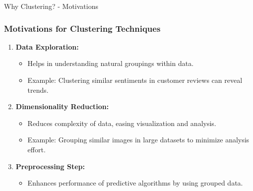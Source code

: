 \documentclass[aspectratio=169]{beamer}
\begin{document}
\begin{frame}[fragile]{Why Clustering? - Motivations}
  \frametitle{Motivations for Clustering Techniques}

  \begin{enumerate}
    \item \textbf{Data Exploration:}
      \begin{itemize}
        \item Helps in understanding natural groupings within data.
        \item Example: Clustering similar sentiments in customer reviews can reveal trends.
      \end{itemize}

    \item \textbf{Dimensionality Reduction:}
      \begin{itemize}
        \item Reduces complexity of data, easing visualization and analysis.
        \item Example: Grouping similar images in large datasets to minimize analysis effort.
      \end{itemize}

    \item \textbf{Preprocessing Step:}
      \begin{itemize}
        \item Enhances performance of predictive algorithms by using grouped data.
      \end{itemize}
  \end{enumerate}
\end{frame}
\end{document}
